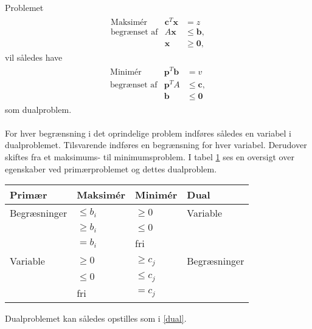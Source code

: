 \noindent
%
Problemet
%
\begin{align*}
\begin{array}{lrl}
\text{Maksimér}		&\textbf{c}^T\textbf{x}	& = z		\\
\text{begrænset af}	&A\textbf{x}	&\leq \mathbf{b},	\\
					&\mathbf{x}				&\geq \mathbf{0},
\end{array}
\end{align*}
%
vil således have
%
\begin{align*}
\begin{array}{lrl}
\text{Minimér}		&\textbf{p}^T\textbf{b}	& = v			\\
\text{begrænset af}	&\textbf{p}^TA	&\leq \mathbf{c},	\\
					&\mathbf{b}				&\leq \mathbf{0}
\end{array}
\end{align*}
%
som dualproblem.
\\\\
%
For hver begrænsning i det oprindelige problem indføres således en variabel i dualproblemet.
Tilsvarende indføres en begrænsning for hver variabel. 
Derudover skiftes fra et maksimums- til minimumsproblem.
I tabel \ref{juliedum} ses en oversigt over egenskaber ved primærproblemet og dettes dualproblem.\\
%
\begin{table}[H]
\begin{center}
\begin{tabular}{llll}
Primær  & Maksimér   & Minimér    & Dual         \\
\hline
Begræsninger & $\leq b_i$ & $\geq 0$   & Variable     \\
             & $\geq b_i$ & $\leq 0$   &              \\
             & $=b_i$     & fri        &            \\ 
\hline             
Variable     & $\geq 0$   & $\geq c_j$ & Begræsninger \\
             & $\leq 0$   & $\leq c_j$ &              \\
             & fri        & $=c_j$     &  
\end{tabular}
\end{center}
\label{juliedum}
\end{table}
\noindent
%
Dualproblemet kan således opstilles som i \ref{dual}. \\
